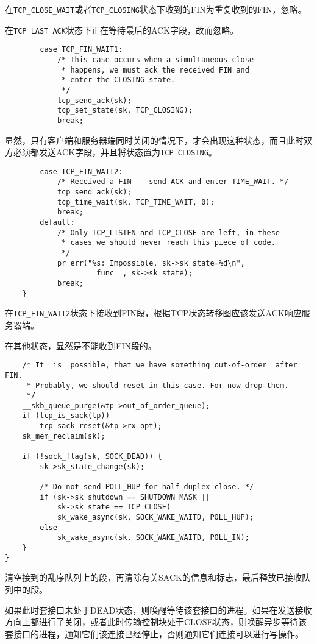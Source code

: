             在\texttt{TCP_CLOSE_WAIT}或者\texttt{TCP_CLOSING}状态下收到的FIN为重复收到的FIN，忽略。

            在\texttt{TCP_LAST_ACK}状态下正在等待最后的ACK字段，故而忽略。

\begin{verbatim}
        case TCP_FIN_WAIT1:
            /* This case occurs when a simultaneous close
             * happens, we must ack the received FIN and
             * enter the CLOSING state.
             */
            tcp_send_ack(sk);
            tcp_set_state(sk, TCP_CLOSING);
            break;
\end{verbatim}

            显然，只有客户端和服务器端同时关闭的情况下，才会出现这种状态，而且此时双方必须都发送ACK字段，并且将状态置为\texttt{TCP_CLOSING}。

\begin{verbatim}
        case TCP_FIN_WAIT2:
            /* Received a FIN -- send ACK and enter TIME_WAIT. */
            tcp_send_ack(sk);
            tcp_time_wait(sk, TCP_TIME_WAIT, 0);
            break;
        default:
            /* Only TCP_LISTEN and TCP_CLOSE are left, in these
             * cases we should never reach this piece of code.
             */
            pr_err("%s: Impossible, sk->sk_state=%d\n",
                   __func__, sk->sk_state);
            break;
    }
\end{verbatim}

            在\texttt{TCP_FIN_WAIT2}状态下接收到FIN段，根据TCP状态转移图应该发送ACK响应服务器端。

            在其他状态，显然是不能收到FIN段的。

\begin{verbatim}
    /* It _is_ possible, that we have something out-of-order _after_ FIN.
     * Probably, we should reset in this case. For now drop them.
     */
    __skb_queue_purge(&tp->out_of_order_queue);
    if (tcp_is_sack(tp))
        tcp_sack_reset(&tp->rx_opt);
    sk_mem_reclaim(sk);

    if (!sock_flag(sk, SOCK_DEAD)) {
        sk->sk_state_change(sk);

        /* Do not send POLL_HUP for half duplex close. */
        if (sk->sk_shutdown == SHUTDOWN_MASK ||
            sk->sk_state == TCP_CLOSE)
            sk_wake_async(sk, SOCK_WAKE_WAITD, POLL_HUP);
        else
            sk_wake_async(sk, SOCK_WAKE_WAITD, POLL_IN);
    }
}
\end{verbatim}

            清空接到的乱序队列上的段，再清除有关SACK的信息和标志，最后释放已接收队列中的段。

            如果此时套接口未处于DEAD状态，则唤醒等待该套接口的进程。如果在发送接收方向上都进行了关闭，或者此时传输控制块处于CLOSE状态，则唤醒异步等待该套接口的进程，通知它们该连接已经停止，否则通知它们连接可以进行写操作。
